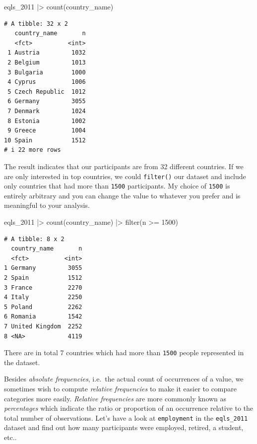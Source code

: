 \documentclass[
  letterpaper,
]{krantz}
\makeatletter
\newenvironment{Shaded}{\begin{snugshade}}{\end{snugshade}}
\newcommand{\DecValTok}[1]{\textcolor[rgb]{0.68,0.00,0.00}{#1}}
\newcommand{\FunctionTok}[1]{\textcolor[rgb]{0.28,0.35,0.67}{#1}}
\newcommand{\NormalTok}[1]{\textcolor[rgb]{0.00,0.23,0.31}{#1}}
\newcommand{\SpecialCharTok}[1]{\textcolor[rgb]{0.37,0.37,0.37}{#1}}
\newenvironment{kframe}{%
\medskip{}
\setlength{\fboxsep}{.8em}
 \def\at@end@of@kframe{}%
 \ifinner\ifhmode%
  \def\at@end@of@kframe{\end{minipage}}%
  \begin{minipage}{\columnwidth}%
 \fi\fi%
 \def\FrameCommand##1{\hskip\@totalleftmargin \hskip-\fboxsep
 \colorbox{shadecolor}{##1}\hskip-\fboxsep
     \hskip-\linewidth \hskip-\@totalleftmargin \hskip\columnwidth}%
 \MakeFramed {\advance\hsize-\width
   \@totalleftmargin\z@ \linewidth\hsize
   \@setminipage}}%
 {\par\unskip\endMakeFramed%
 \at@end@of@kframe}
\renewenvironment{Shaded}{\begin{kframe}}{\end{kframe}}
\makeatother
\begin{document}
\begin{Shaded}
\begin{Highlighting}[]
\NormalTok{eqls\_2011 }\SpecialCharTok{|\textgreater{}} \FunctionTok{count}\NormalTok{(country\_name)}
\end{Highlighting}
\end{Shaded}

\begin{verbatim}
# A tibble: 32 x 2
   country_name       n
   <fct>          <int>
 1 Austria         1032
 2 Belgium         1013
 3 Bulgaria        1000
 4 Cyprus          1006
 5 Czech Republic  1012
 6 Germany         3055
 7 Denmark         1024
 8 Estonia         1002
 9 Greece          1004
10 Spain           1512
# i 22 more rows
\end{verbatim}

The result indicates that our participants are from 32 different
countries. If we are only interested in top countries, we could
\texttt{filter()} our dataset and include only countries that had more
than \texttt{1500} participants. My choice of \texttt{1500} is entirely
arbitrary and you can change the value to whatever you prefer and is
meaningful to your analysis.

\begin{Shaded}
\begin{Highlighting}[]
\NormalTok{eqls\_2011 }\SpecialCharTok{|\textgreater{}}
  \FunctionTok{count}\NormalTok{(country\_name) }\SpecialCharTok{|\textgreater{}}
  \FunctionTok{filter}\NormalTok{(n }\SpecialCharTok{\textgreater{}=} \DecValTok{1500}\NormalTok{)}
\end{Highlighting}
\end{Shaded}

\begin{verbatim}
# A tibble: 8 x 2
  country_name       n
  <fct>          <int>
1 Germany         3055
2 Spain           1512
3 France          2270
4 Italy           2250
5 Poland          2262
6 Romania         1542
7 United Kingdom  2252
8 <NA>            4119
\end{verbatim}

There are in total 7 countries which had more than \texttt{1500} people
represented in the dataset.

Besides \emph{absolute frequencies}, i.e.~the actual count of
occurrences of a value, we sometimes wish to compute \emph{relative
frequencies} to make it easier to compare categories more easily.
\emph{Relative frequencies} are more commonly known as
\emph{percentages} which indicate the ratio or proportion of an
occurrence relative to the total number of observations. Let's have a
look at \texttt{employment} in the \texttt{eqls\_2011} dataset and find
out how many participants were employed, retired, a student, etc..
\end{document}
